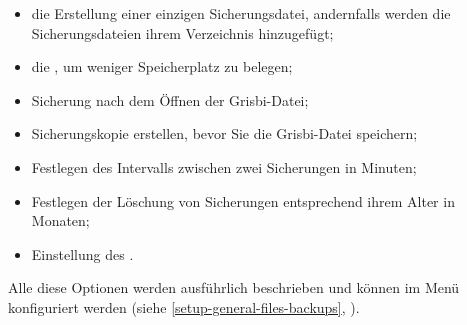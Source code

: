 \begin{itemize}
	\item die Erstellung einer einzigen Sicherungsdatei, andernfalls werden die Sicherungsdateien ihrem Verzeichnis hinzugefügt;
	\item die , um weniger Speicherplatz zu belegen;
	\item Sicherung nach dem Öffnen der Grisbi-Datei;
	\item Sicherungskopie erstellen, bevor Sie die Grisbi-Datei speichern;
	\item Festlegen des Intervalls zwischen zwei Sicherungen in Minuten;
	\item Festlegen der Löschung von Sicherungen entsprechend ihrem Alter in Monaten;
	\item Einstellung des .
\end{itemize}

Alle diese Optionen werden ausführlich beschrieben und können im Menü  konfiguriert werden (siehe \vref{setup-general-files-backups}, ).

